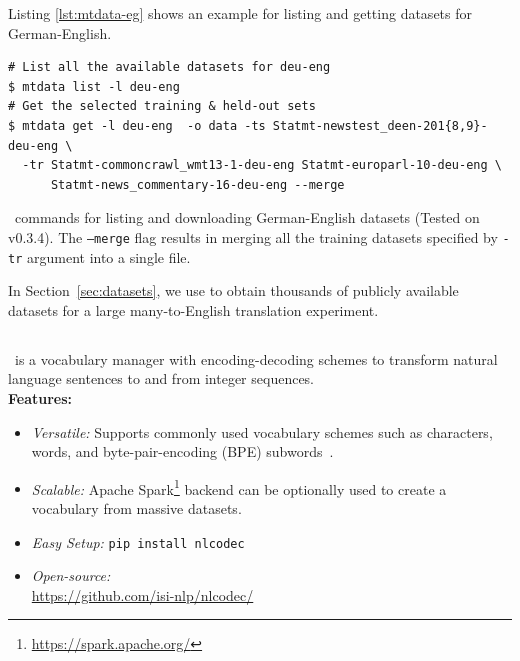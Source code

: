 Listing \ref{lst:mtdata-eg} shows an example for listing and getting datasets for German-English.
\begin{listing}
\begin{verbatim}
# List all the available datasets for deu-eng
$ mtdata list -l deu-eng
# Get the selected training & held-out sets
$ mtdata get -l deu-eng  -o data -ts Statmt-newstest_deen-201{8,9}-deu-eng \ 
  -tr Statmt-commoncrawl_wmt13-1-deu-eng Statmt-europarl-10-deu-eng \ 
      Statmt-news_commentary-16-deu-eng --merge
\end{verbatim}
\caption{\mtdata\ commands for listing and downloading German-English datasets (Tested on v0.3.4).
The \texttt{--merge} flag results in merging all the training datasets specified by \texttt{-tr} argument into a single file. }
\label{lst:mtdata-eg}
\end{listing}
 In Section~\ref{sec:datasets}, we use \mtdata to obtain thousands of publicly available datasets for a large many-to-English translation experiment.

\subsection{\nlcodec}
\label{sec:nlcodec}
\nlcodec\ is a vocabulary manager with encoding-decoding schemes to transform natural language sentences to and from integer sequences.\\
\textbf{Features:}
\begin{itemize}[noitemsep,topsep=0pt,leftmargin=4mm]
\item \textit{Versatile:} Supports commonly used vocabulary schemes such as characters, words, and byte-pair-encoding (BPE) subwords~\cite{sennrich-etal-2016-bpe}.
\item \textit{Scalable:} Apache Spark\footnote{\url{https://spark.apache.org/}}\cite{zaharia2016spark} backend can be optionally used to create a vocabulary from massive datasets.
\item \textit{Easy Setup:} \texttt{pip install nlcodec} 
\item \textit{Open-source:}\\ \url{https://github.com/isi-nlp/nlcodec/}
\end{itemize}

